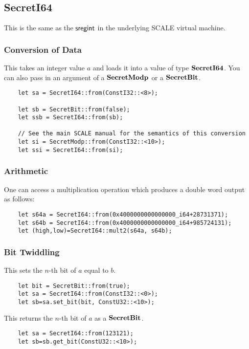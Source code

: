 \subsection{SecretI64}
This is the same as the $\mathsf{sregint}$ in the underlying SCALE virtual machine.

\subsubsection{Conversion of Data}
This takes an integer value $a$ and loads it into a value
of type $\mathbf{SecretI64}$.
You can also pass in an argument of a $\mathbf{SecretModp}$ or a $\mathbf{SecretBit}$.
\begin{lstlisting}
    let sa = SecretI64::from(ConstI32::<8>);

    let sb = SecretBit::from(false);
    let ssb = SecretI64::from(sb);

    // See the main SCALE manual for the semantics of this conversion
    let si = SecretModp::from(ConstI32::<10>);
    let ssi = SecretI64::from(si);
\end{lstlisting}


\subsubsection{Arithmetic}
One can access a multiplication operation which produces a double
word output as follows:
\begin{lstlisting}
    let s64a = SecretI64::from(0x4000000000000000_i64+28731371);
    let s64b = SecretI64::from(0x4000000000000000_i64+985724131);
    let (high,low)=SecretI64::mult2(s64a, s64b);
\end{lstlisting}


\subsubsection{Bit Twiddling}

This sets the $n$-th bit of $a$ equal to $b$.
\begin{lstlisting}
    let bit = SecretBit::from(true);
    let sa = SecretI64::from(ConstI32::<0>);
    let sb=sa.set_bit(bit, ConstU32::<10>);
\end{lstlisting}

This returns the $n$-th bit of $a$ as a $\mathbf{SecretBit}$.
\begin{lstlisting}
    let sa = SecretI64::from(123121);
    let sb=sb.get_bit(ConstU32::<10>);
\end{lstlisting}

